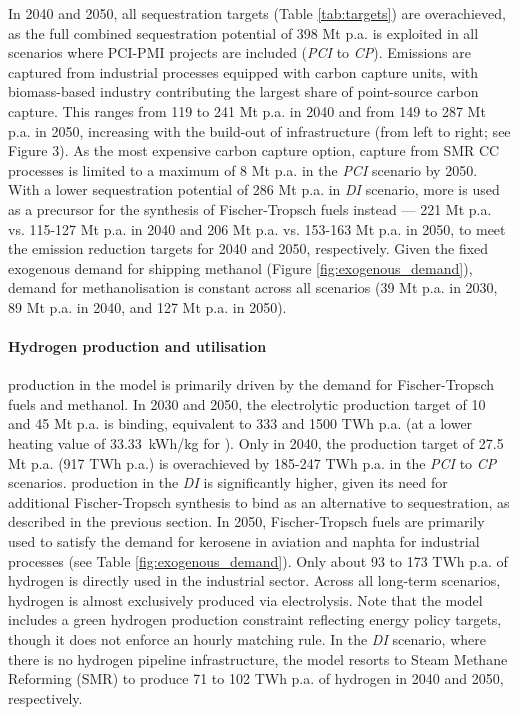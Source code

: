 \documentclass[preprint,12pt,sort&compress]{elsarticle}
\begin{document}
In 2040 and 2050, all sequestration targets (Table \ref{tab:targets}) are overachieved, as the full combined  sequestration potential of 398 Mt p.a. is exploited in all scenarios where PCI-PMI projects are included (\textit{PCI} to \textit{CP}). 
Emissions are captured from industrial processes equipped with carbon capture units, with biomass-based industry contributing the largest share of point-source carbon capture. This ranges from 119 to 241 Mt p.a. in 2040 and from 149 to 287 Mt p.a. in 2050, increasing with the build-out of  infrastructure (from left to right; see Figure 3). As the most expensive carbon capture option,  capture from SMR CC processes is limited to a maximum of 8 Mt p.a. in the \textit{PCI} scenario by 2050.
With a lower sequestration potential of 286 Mt p.a. in \textit{DI} scenario, more  is used as a precursor for the synthesis of Fischer-Tropsch fuels instead --- 221 Mt p.a. vs. 115-127 Mt p.a. in 2040 and 206 Mt p.a. vs. 153-163 Mt p.a. in 2050, to meet the emission reduction targets for 2040 and 2050, respectively. 
Given the fixed exogenous demand for shipping methanol (Figure \ref{fig:exogenous_demand}),  demand for methanolisation is constant across all scenarios (39 Mt p.a. in 2030, 89 Mt p.a. in 2040, and 127 Mt p.a. in 2050). 

\paragraph{Hydrogen production and utilisation}
\label{sec:h2_production_and_utilisation}
 production in the model is primarily driven by the demand for Fischer-Tropsch fuels and methanol. In 2030 and 2050, the electrolytic  production target of 10 and 45 Mt p.a. is binding, equivalent to 333 and 1500 TWh p.a. (at a lower heating value of \SI{33.33}{kWh/kg} for ). Only in 2040, the  production target of 27.5 Mt p.a. (917 TWh p.a.) is overachieved by 185-247 TWh p.a. in the \textit{PCI} to \textit{CP} scenarios.  production in the \textit{DI} is significantly higher, given its need for additional Fischer-Tropsch synthesis to bind  as an alternative to sequestration, as described in the previous section.
In 2050, Fischer-Tropsch fuels are primarily used to satisfy the demand for kerosene in aviation and naphta for industrial processes (see Table \ref{fig:exogenous_demand}). Only about 93 to 173 TWh p.a. of hydrogen is directly used in the industrial sector. Across all long-term scenarios, hydrogen is almost exclusively produced via electrolysis. Note that the model includes a green hydrogen production constraint reflecting energy policy targets, though it does not enforce an hourly matching rule.
In the \textit{DI} scenario, where there is no hydrogen pipeline infrastructure, the model resorts to Steam Methane Reforming (SMR) to produce 71 to 102 TWh p.a. of hydrogen in 2040 and 2050, respectively.
\end{document}
